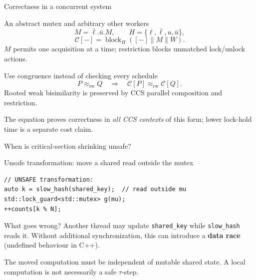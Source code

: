 \documentclass[handout,aspectratio=169,11pt]{beamer}
\newcommand{\rwb}{\mathrel{\approx_{\mathrm{rw}}}}
\newcommand{\blockact}[2]{\operatorname{block}_{#1}(#2)}
\newcommand{\Takeaway}[1]{\begin{exampleblock}{}#1\end{exampleblock}}
\begin{document}
\begin{frame}{Correctness in a concurrent system}
  \small
  \begin{block}{An abstract mutex and arbitrary other workers}
    \[
      M=\bar\ell.\bar u.M,\qquad
      H=\{\ell,\bar\ell,u,\bar u\},
    \]
    \[
      \mathcal C[-]
      =\blockact{H}{[-]\parallel M\parallel W}.
    \]
    $M$ permits one acquisition at a time; restriction blocks
    unmatched lock/unlock actions.
  \end{block}
  \begin{exampleblock}{Use congruence instead of checking every schedule}
    \[
      P\rwb Q
      \quad\Longrightarrow\quad
      \boxed{\mathcal C[P]\rwb\mathcal C[Q]}.
    \]
    Rooted weak bisimilarity is preserved by CCS parallel composition
    and restriction.
  \end{exampleblock}
  \Takeaway{The equation proves correctness in \emph{all CCS contexts}
    of this form; lower lock-hold time is a separate cost claim.}
\end{frame}

\begin{frame}[fragile]{When is critical-section shrinking unsafe?}
  \small
  \begin{alertblock}{Unsafe transformation: move a shared read outside the mutex}
    \vspace{1mm}
    \scriptsize
\begin{verbatim}
// UNSAFE transformation:
auto k = slow_hash(shared_key);  // read outside mu
std::lock_guard<std::mutex> g(mu);
++counts[k % N];
\end{verbatim}
    \vspace{-1mm}
  \end{alertblock}

  \begin{block}{What goes wrong?}
    Another thread may update \texttt{shared\_key} while
    \texttt{slow\_hash} reads it. Without additional synchronization,
    this can introduce a \textbf{data race} (undefined behaviour in C++).
  \end{block}

  \Takeaway{The moved computation must be independent of mutable
    shared state. A local computation is not necessarily a safe $\tau$-step.}

\end{frame}
\end{document}
